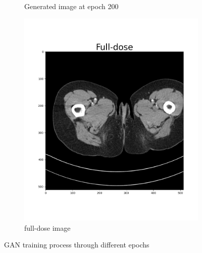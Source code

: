 \documentclass[journal]{IEEEtran}
\begin{document}
\begin{figure}
\begin{subfigure}[t]{0.22\textwidth}
         \caption{Generated image at epoch 200}
         \label{epoch200}
     \end{subfigure}
     \begin{subfigure}[t]{0.22\textwidth}
         \centering
         \includegraphics[width=\textwidth]{fulldose}
         \caption{full-dose image}
         \label{fulldose}
     \end{subfigure}
        \caption{GAN training process through different epochs}
        \label{GANtraining}
\end{figure}

\end{document}
